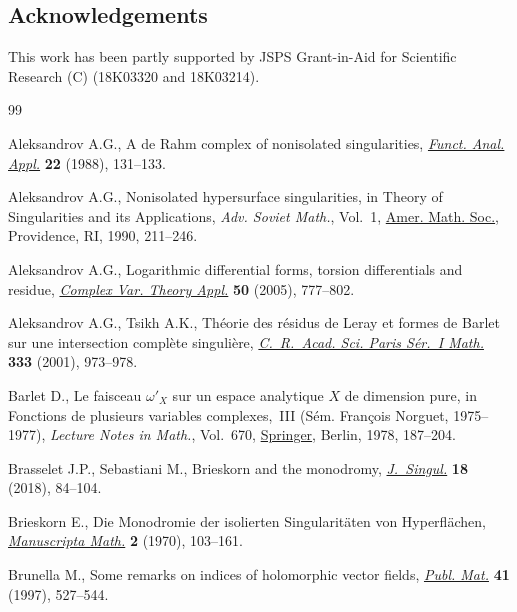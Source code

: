 \documentclass[pdftex]{sigma}%
\numberwithin{equation}{section}
\begin{document}
\subsection*{Acknowledgements}
{\sloppy
This work has been partly supported by JSPS Grant-in-Aid for Scientific Research (C) (18K03320 and 18K03214).

}


\begin{thebibliography}{99}
\footnotesize\itemsep=0pt

Aleksandrov A.G., A de {R}ahm complex of nonisolated singularities,
 \href{https://doi.org/10.1007/BF01077604}{\textit{Funct. Anal. Appl.}} \textbf{22} (1988), 131--133.

Aleksandrov A.G., Nonisolated hypersurface singularities, in Theory of
 Singularities and its Applications, \textit{Adv. Soviet Math.}, Vol.~1, \href{https://doi.org/10.1070/sm1990v065n02abeh001164}{Amer.
 Math. Soc.}, Providence, RI, 1990, 211--246.

Aleksandrov A.G., Logarithmic differential forms, torsion differentials and
 residue, \href{https://doi.org/10.1080/02781070500128313}{\textit{Complex Var. Theory Appl.}} \textbf{50} (2005), 777--802.

Aleksandrov A.G., Tsikh A.K., Th\'eorie des r\'esidus de {L}eray et formes de
 {B}arlet sur une intersection compl\`ete singuli\`ere, \href{https://doi.org/10.1016/S0764-4442(01)02166-8}{\textit{C.~R.~Acad.
 Sci. Paris S\'er.~I Math.}} \textbf{333} (2001), 973--978.

Barlet D., Le faisceau {$\omega'_{X}$} sur un espace analytique {$X$} de
 dimension pure, in Fonctions de plusieurs variables complexes,~{III}
 ({S}\'em. {F}ran\c{c}ois {N}orguet, 1975--1977), \textit{Lecture Notes in
 Math.}, Vol.~670, \href{https://doi.org/10.1007/BFb0064400}{Springer}, Berlin, 1978, 187--204.

Brasselet J.P., Sebastiani M., Brieskorn and the monodromy, \href{https://doi.org/10.5427/jsing.2018.18f}{\textit{J.~Singul.}}
 \textbf{18} (2018), 84--104.

Brieskorn E., Die {M}onodromie der isolierten {S}ingularit\"aten von
 {H}yperfl\"achen, \href{https://doi.org/10.1007/BF01155695}{\textit{Manuscripta Math.}} \textbf{2} (1970), 103--161.

Brunella M., Some remarks on indices of holomorphic vector fields,
 \href{https://doi.org/10.5565/PUBLMAT_41297_17}{\textit{Publ. Mat.}} \textbf{41} (1997), 527--544.


\end{thebibliography}
\end{document}
